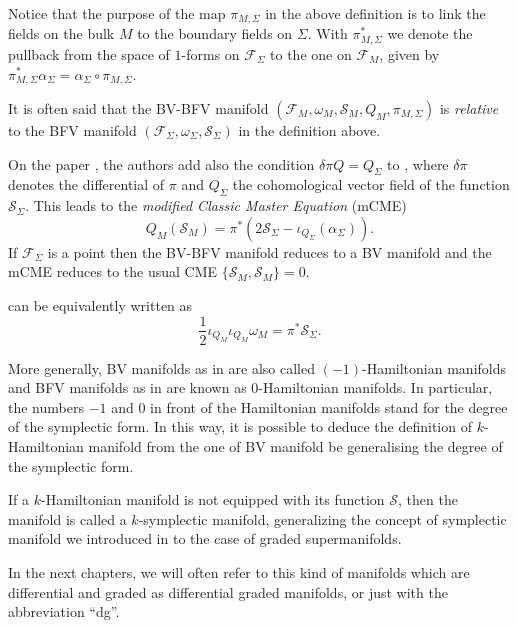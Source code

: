 Notice that the purpose of the map $\pi_{M, \Sigma}$ in the above definition is to link the fields on the bulk $M$ to the boundary fields on $\Sigma$.
With $\pi_{M,\Sigma}^*$ we denote the pullback from the space of $1$-forms on $\mathcal{F}_\Sigma$ to the one on $\mathcal{F}_M$, given by $\pi_{M,\Sigma}^* \alpha_\Sigma = \alpha_\Sigma \circ \pi_{M,\Sigma}$.

It is often said that the BV-BFV manifold $(\mathcal{F}_M, \omega_M, \mathcal{S}_M, Q_M, \pi_{M, \Sigma})$ is \emph{relative} to the BFV manifold $(\mathcal{F}_\Sigma, \omega_\Sigma, \mathcal{S}_\Sigma)$ in the definition above.

On the paper \cite{mCME}, the authors add also the condition $\delta \pi Q = Q_\Sigma$ to , where $\delta \pi$ denotes the differential of $\pi$ and $Q_\Sigma$ the cohomological vector field of the function $\mathcal{S}_\Sigma$.
This leads to the \emph{modified Classic Master Equation} (mCME)
\begin{equation}
\label{eq:mCME}
    Q_M (\mathcal{S}_M) = \pi ^* (2 \mathcal{S}_\Sigma - \iota_{Q_\Sigma}(\alpha_\Sigma)).
\end{equation}
If $\mathcal{F}_\Sigma$ is a point then the BV-BFV manifold reduces to a BV manifold and the mCME reduces to the usual CME $\{\mathcal{S}_M, \mathcal{S}_M\} = 0$.

 can be equivalently written as
\begin{equation*}
    \frac{1}{2} \iota_{Q_M} \iota_{Q_M} \omega_M =  \pi^* \mathcal{S}_\Sigma .
\end{equation*}

More generally, BV manifolds as in  are also called $(-1)$-Hamiltonian manifolds and BFV manifolds as in  are known as $0$-Hamiltonian manifolds.
In particular, the numbers $-1$ and $0$ in front of the Hamiltonian manifolds stand for the degree of the symplectic form.
In this way, it is possible to deduce the definition of $k$-Hamiltonian manifold from the one of BV manifold be generalising the degree of the symplectic form.

If a $k$-Hamiltonian manifold is not equipped with its function $\mathcal{S}$, then the manifold is called a $k$-symplectic manifold, generalizing the concept of symplectic manifold we introduced in  to the case of graded supermanifolds.

In the next chapters, we will often refer to this kind of manifolds which are differential and graded as differential graded manifolds, or just with the abbreviation “dg”.
